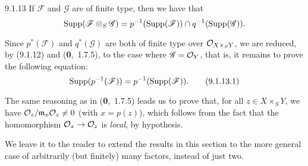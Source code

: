 \documentclass[../main.tex]{subfiles}
\begin{document}
\begin{cx}[Corollary]{9.1.13}
    If $\mathscr{F}$ and $\mathscr{G}$ are of finite type, then we have that
    \begin{equation*}
        \operatorname*{Supp}(\mathscr{F}\otimes_S\mathscr{G}) = p^{-1}(\operatorname*{Supp}(\mathscr{F}))\cap q^{-1}(\operatorname*{Supp}(\mathscr{G})).
    \end{equation*}
\end{cx}

Since $p^*(\mathscr{F})$ and $q^*(\mathscr{G})$ are both of finite type over $\mathcal{O}_{X\times_S Y}$, we are reduced, by (9.1.12) and (\textbf{0},~1.7.5), to the case where $\mathscr{G}=\mathcal{O}_Y$, that is, it remains to prove the following equation:
\begin{equation*}
    \operatorname*{Supp}(p^{-1}(\mathscr{F})) = p^{-1}(\operatorname*{Supp}(\mathscr{F})).\tag{9.1.13.1}
\end{equation*}

The same reasoning as in (\textbf{0},~1.7.5) leads us to prove that, for all $z\in X\times_S Y$, we have $\mathcal{O}_z/\mathfrak{m}_x\mathcal{O}_z\neq0$ (with $x=p(z)$), which follows from the fact that the homomorphism $\mathcal{O}_x\to\mathcal{O}_z$ is \emph{local}, by hypothesis.

We leave it to the reader to extend the results in this section to the more general case of arbitrarily (but finitely) many factors, instead of just two.
\end{document}
